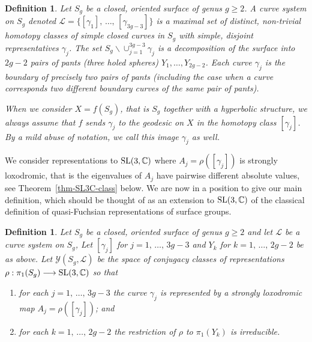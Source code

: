 \documentclass[11pt]{amsart}
\newtheorem{definition}[theorem]{Definition}
\numberwithin{equation}{section}
\begin{document}
\begin{definition}\label{def-curve-system}
Let $S_g$ be a closed, oriented surface of genus $g\ge 2$. A {\sl curve system} on $S_g$ denoted
$\mathcal{L}=\{[\gamma_1],\,\ldots,\,[\gamma_{3g-3}]\}$ is a maximal set of distinct, non-trivial homotopy 
classes of simple closed curves in $S_g$ with simple, disjoint representatives $\gamma_j$.
The set $S_g\backslash\cup_{j=1}^{3g-3}\gamma_j$ is a decomposition of the 
surface into $2g-2$ pairs of pants (three holed spheres) $Y_1,\ldots,Y_{2g-2}$. Each curve 
$\gamma_j$ is the boundary of precisely two pairs of pants (including the case when a curve corresponds two different 
boundary curves of the same pair of pants).

When we consider $X=f(S_g)$, that is $S_g$ together with a hyperbolic 
structure, we always assume that $f$ sends $\gamma_j$ to the geodesic on $X$ in the homotopy class $[\gamma_j]$. 
By a mild abuse of notation, we call this image $\gamma_j$ as well. 
\end{definition}

%

We consider representations to ${\rm SL}(3,{\mathbb C})$ where $A_j=\rho([\gamma_j])$ is strongly loxodromic, that
is the eigenvalues of $A_j$ have pairwise different absolute values, see Theorem~\ref{thm-SL3C-class} below.
We are now in a position to give our main definition, which should be thought of as an extension to
${\rm SL}(3,{\mathbb C})$ of the classical definition of quasi-Fuchsian representations of surface groups.


\begin{definition}\label{def-FN-space}
Let $S_g$ be a closed, oriented surface of genus $g\ge 2$ and let ${\mathcal L}$ be a curve system on $S_g$,
Let $[\gamma_j]$ for $j=1,\,\ldots,\, 3g-3$ and $Y_k$ for $k=1,\,\ldots,\,2g-2$ be as above.
Let ${\mathcal Y}(S_g,{\mathcal L})$ be the space of conjugacy classes of representations
$\rho:\pi_1(S_g)\longrightarrow {\rm SL}(3,{\mathbb C})$ so that
\begin{enumerate}
\item[(1)] for each $j=1,\,\ldots,\,3g-3$ the curve $\gamma_j$ is represented by a strongly loxodromic map 
$A_j=\rho([\gamma_j])$; and
\item[(2)] for each $k=1,\,\ldots,\,2g-2$ the restriction of $\rho$ to $\pi_1(Y_k)$ is irreducible.
\end{enumerate}
\end{definition}
\end{document}
